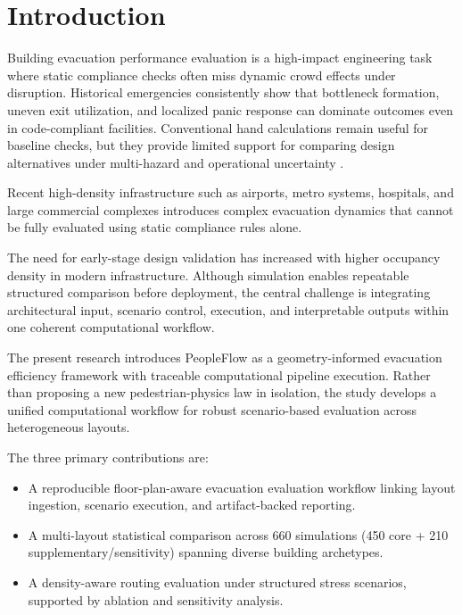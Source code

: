 \documentclass[journal]{IEEEtran}
\begin{document}
\section{Introduction}
Building evacuation performance evaluation is a high-impact engineering task where static compliance checks often miss dynamic crowd effects under disruption. Historical emergencies consistently show that bottleneck formation, uneven exit utilization, and localized panic response can dominate outcomes even in code-compliant facilities. Conventional hand calculations remain useful for baseline checks, but they provide limited support for comparing design alternatives under multi-hazard and operational uncertainty \cite{sfpe,evac_review}.

Recent high-density infrastructure such as airports, metro systems, hospitals, and large commercial complexes introduces complex evacuation dynamics that cannot be fully evaluated using static compliance rules alone.

The need for early-stage design validation has increased with higher occupancy density in modern infrastructure. Although simulation enables repeatable structured comparison before deployment, the central challenge is integrating architectural input, scenario control, execution, and interpretable outputs within one coherent computational workflow.

The present research introduces PeopleFlow as a geometry-informed evacuation efficiency framework with traceable computational pipeline execution. Rather than proposing a new pedestrian-physics law in isolation, the study develops a unified computational workflow for robust scenario-based evaluation across heterogeneous layouts.

The three primary contributions are:
\begin{itemize}
    \item A reproducible floor-plan-aware evacuation evaluation workflow linking layout ingestion, scenario execution, and artifact-backed reporting.
    \item A multi-layout statistical comparison across 660 simulations (450 core + 210 supplementary/sensitivity) spanning diverse building archetypes.
    \item A density-aware routing evaluation under structured stress scenarios, supported by ablation and sensitivity analysis.
\end{itemize}
\end{document}

